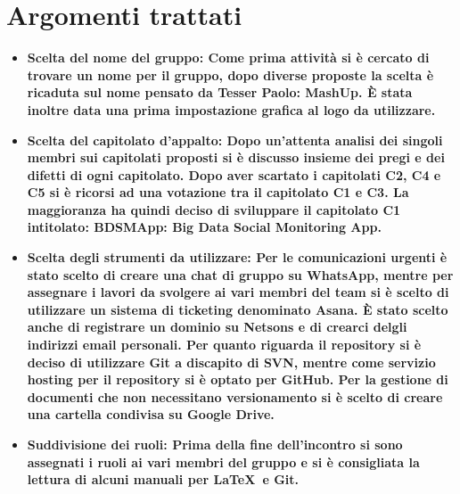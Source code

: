 \section{Argomenti trattati}
\begin{itemize}
  \item \bfseries{Scelta del nome del gruppo:} \textnormal{Come prima attività si è cercato di trovare un nome per il gruppo, dopo diverse proposte la scelta è ricaduta sul nome pensato da Tesser Paolo: \bfseries{MashUp}\textnormal{. È stata inoltre data una prima impostazione grafica al logo da utilizzare.}}
  \item \bfseries{Scelta del capitolato d'appalto:} \textnormal{Dopo un'attenta analisi dei singoli membri sui capitolati proposti si è discusso  insieme dei pregi e dei difetti di ogni capitolato. Dopo aver scartato i capitolati C2, C4 e C5 si è ricorsi ad una votazione tra il capitolato C1 e C3. La maggioranza ha quindi deciso di sviluppare il capitolato \bfseries{C1} \textnormal{intitolato:} \bfseries{BDSMApp: Big Data Social Monitoring App\textnormal{.}}}
  \item \bfseries{Scelta degli strumenti da utilizzare:} \textnormal{Per le comunicazioni urgenti è stato scelto di creare una chat di gruppo su WhatsApp, mentre per assegnare i lavori da svolgere ai vari membri del team si è scelto di utilizzare un sistema di ticketing denominato Asana.
  È stato scelto anche di registrare un dominio su Netsons e di crearci delgli indirizzi email personali.
  Per quanto riguarda il repository si è deciso di utilizzare Git a discapito di SVN, mentre come servizio hosting per il repository si è optato per GitHub. Per la gestione di documenti che non necessitano versionamento si è scelto di creare una cartella condivisa su Google Drive.}
  \item \bfseries{Suddivisione dei ruoli:} \textnormal{Prima della fine dell'incontro si sono assegnati i ruoli ai vari membri del gruppo e si è consigliata la lettura di alcuni manuali per \LaTeX\ e Git.}
\end{itemize}


